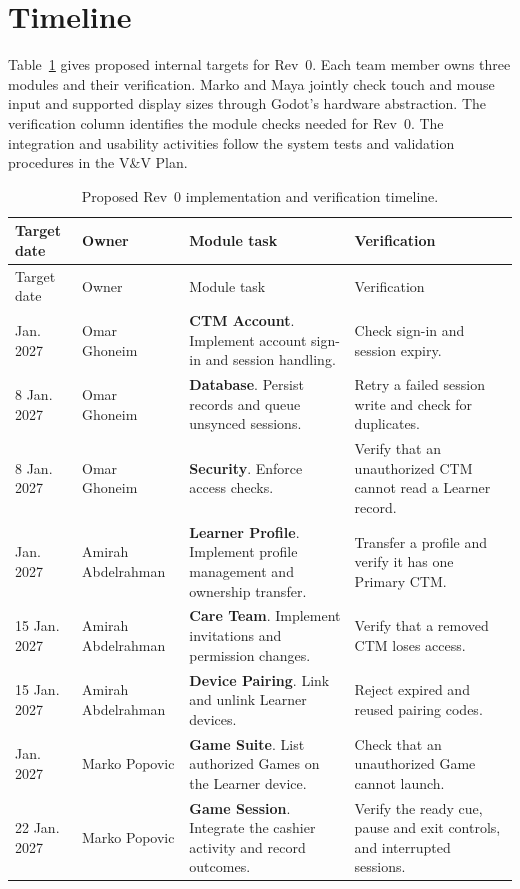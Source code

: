 \documentclass[12pt, titlepage]{article}
\begin{document}
\section{Timeline}
\label{sec:timeline}

Table~\ref{tab:module-timeline} gives proposed internal targets for Rev~0.
Each team member owns three modules and their verification. Marko and Maya
jointly check touch and mouse input and supported display sizes through
Godot's hardware abstraction. The verification column identifies the
module checks needed for Rev~0. The integration and usability activities
follow the system tests and validation procedures in the V\&V Plan.

\begin{longtable}{@{}p{}p{}p{}p{}@{}}
\caption{Proposed Rev~0 implementation and verification timeline.}
\label{tab:module-timeline}\\
\toprule
Target date & Owner & Module task & Verification \\
\midrule
\endfirsthead
\toprule
Target date & Owner & Module task & Verification \\
\midrule
\endhead
\bottomrule
\endfoot
8 Jan. 2027 & Omar Ghoneim & \textbf{CTM Account}. Implement account sign-in and session handling. & Check sign-in and session expiry. \\
8 Jan. 2027 & Omar Ghoneim & \textbf{Database}. Persist records and queue unsynced sessions. & Retry a failed session write and check for duplicates. \\
8 Jan. 2027 & Omar Ghoneim & \textbf{Security}. Enforce access checks. & Verify that an unauthorized CTM cannot read a Learner record. \\
\addlinespace
15 Jan. 2027 & Amirah Abdelrahman & \textbf{Learner Profile}. Implement profile management and ownership transfer. & Transfer a profile and verify it has one Primary CTM. \\
15 Jan. 2027 & Amirah Abdelrahman & \textbf{Care Team}. Implement invitations and permission changes. & Verify that a removed CTM loses access. \\
15 Jan. 2027 & Amirah Abdelrahman & \textbf{Device Pairing}. Link and unlink Learner devices. & Reject expired and reused pairing codes. \\
\addlinespace
22 Jan. 2027 & Marko Popovic & \textbf{Game Suite}. List authorized Games on the Learner device. & Check that an unauthorized Game cannot launch. \\
22 Jan. 2027 & Marko Popovic & \textbf{Game Session}. Integrate the cashier activity and record outcomes. & Verify the ready cue, pause and exit controls, and interrupted sessions. \\

\end{longtable}
\end{document}
